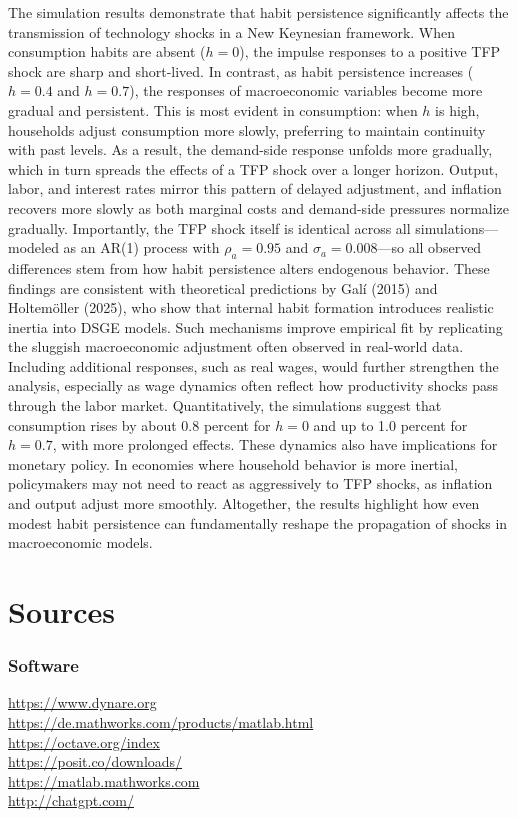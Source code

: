 \documentclass[12pt,a4paper,notitlepage]{article}
\numberwithin{equation}{section}
\begin{document}
\begin{itemize}
\begin{itemize}
The simulation results demonstrate that habit persistence significantly affects the transmission of technology shocks in a New Keynesian framework. When consumption habits are absent (\( h = 0 \)), the impulse responses to a positive TFP shock are sharp and short-lived. In contrast, as habit persistence increases (\( h = 0.4 \) and \( h = 0.7 \)), the responses of macroeconomic variables become more gradual and persistent. This is most evident in consumption: when \( h \) is high, households adjust consumption more slowly, preferring to maintain continuity with past levels. As a result, the demand-side response unfolds more gradually, which in turn spreads the effects of a TFP shock over a longer horizon. Output, labor, and interest rates mirror this pattern of delayed adjustment, and inflation recovers more slowly as both marginal costs and demand-side pressures normalize gradually. Importantly, the TFP shock itself is identical across all simulations—modeled as an AR(1) process with \( \rho_a = 0.95 \) and \( \sigma_a = 0.008 \)—so all observed differences stem from how habit persistence alters endogenous behavior. These findings are consistent with theoretical predictions by Galí (2015) and Holtemöller (2025), who show that internal habit formation introduces realistic inertia into DSGE models. Such mechanisms improve empirical fit by replicating the sluggish macroeconomic adjustment often observed in real-world data. Including additional responses, such as real wages, would further strengthen the analysis, especially as wage dynamics often reflect how productivity shocks pass through the labor market. Quantitatively, the simulations suggest that consumption rises by about 0.8 percent for \( h = 0 \) and up to 1.0 percent for \( h = 0.7 \), with more prolonged effects. These dynamics also have implications for monetary policy. In economies where household behavior is more inertial, policymakers may not need to react as aggressively to TFP shocks, as inflation and output adjust more smoothly. Altogether, the results highlight how even modest habit persistence can fundamentally reshape the propagation of shocks in macroeconomic models.





\newpage


\section{Sources}
\subsubsection*{Software}
	\url{https://www.dynare.org} \\
	\url{https://de.mathworks.com/products/matlab.html} \\
	\url {https://octave.org/index}\\
     \url{https://posit.co/downloads/}\\
     \url{https://matlab.mathworks.com} \\
     \url{http://chatgpt.com/}
     \\
     

\end{itemize}
\end{itemize}
\end{document}

